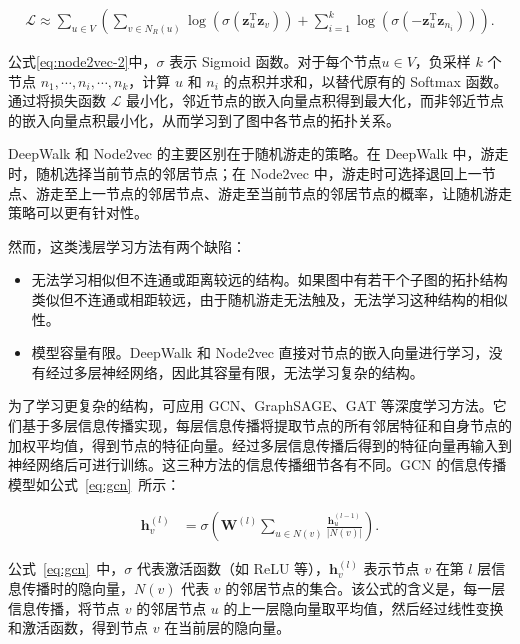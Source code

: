 {\begin{equation}
    \label{eq:node2vec-2}
    \begin{split}
        \mathcal{L} \approx \sum_{u \in V} (\sum_{v \in N_R(u)}\log(\sigma(\mathbf{z}_u^{\mathrm{T}} \mathbf{z}_v))+\sum_{i=1}^k \log(\sigma(-\mathbf{z}_u^{\mathrm{T}} \mathbf{z}_{n_i}))).
    \end{split}
\end{equation}

公式\eqref{eq:node2vec-2}中，$\sigma$ 表示 Sigmoid 函数。对于每个节点$u \in V$，负采样 $k$ 个节点 $n_1, \cdots, n_i, \cdots, n_k$，计算 $u$ 和 $n_i$ 的点积并求和，以替代原有的 Softmax 函数。通过将损失函数 $\mathcal{L}$ 最小化，邻近节点的嵌入向量点积得到最大化，而非邻近节点的嵌入向量点积最小化，从而学习到了图中各节点的拓扑关系。

DeepWalk 和 Node2vec 的主要区别在于随机游走的策略。在 DeepWalk 中，游走时，随机选择当前节点的邻居节点；在 Node2vec 中，游走时可选择退回上一节点、游走至上一节点的邻居节点、游走至当前节点的邻居节点的概率，让随机游走策略可以更有针对性。

然而，这类浅层学习方法有两个缺陷：

\begin{itemize}
    \item 无法学习相似但不连通或距离较远的结构。如果图中有若干个子图的拓扑结构类似但不连通或相距较远，由于随机游走无法触及，无法学习这种结构的相似性。
    \item 模型容量有限。DeepWalk 和 Node2vec 直接对节点的嵌入向量进行学习，没有经过多层神经网络，因此其容量有限，无法学习复杂的结构。
\end{itemize}

为了学习更复杂的结构，可应用 GCN、GraphSAGE、GAT 等深度学习方法。它们基于多层信息传播实现，每层信息传播将提取节点的所有邻居特征和自身节点的加权平均值，得到节点的特征向量。经过多层信息传播后得到的特征向量再输入到神经网络后可进行训练。这三种方法的信息传播细节各有不同。GCN 的信息传播模型如公式~\eqref{eq:gcn}~所示：

\begin{equation}
    \label{eq:gcn}
    \begin{split}
        \mathbf{h}_v^{(l)} &= \sigma(\mathbf{W}^{(l)} \sum_{u \in N(v)}  \frac{\mathbf{h}_u^{(l-1)}}{\left|N(v)\right|}).
    \end{split}
\end{equation}

公式~\eqref{eq:gcn}~中，$\sigma$ 代表激活函数（如 ReLU 等），$\mathbf{h}_v^{(l)}$ 表示节点 $v$ 在第 $l$ 层信息传播时的隐向量，$N(v)$ 代表 $v$ 的邻居节点的集合。该公式的含义是，每一层信息传播，将节点 $v$ 的邻居节点 $u$ 的上一层隐向量取平均值，然后经过线性变换和激活函数，得到节点 $v$ 在当前层的隐向量。

}
